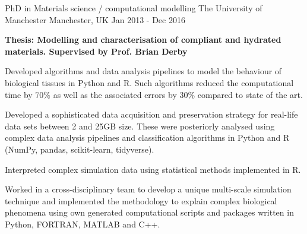 


\begin{cventries}


\cventry
{PhD in Materials science / computational modelling}%
{The University of Manchester} %
{Manchester, UK} %
{Jan 2013 - Dec 2016} %
{ %
\begin{cvitems}
\item[]{\textbf{Thesis: Modelling and characterisation of compliant and hydrated materials. Supervised by Prof. Brian Derby}}
\item{ Developed algorithms and data analysis pipelines to model the behaviour of biological tissues in Python and R. Such algorithms reduced  the computational time by 70\% as well as the associated errors by 30\% compared to state of the art.}
\item{Developed a sophisticated data acquisition and preservation strategy for real-life data sets between 2 and 25GB size. These were posteriorly analysed using complex data analysis pipelines and classification algorithms in Python and R (NumPy, pandas, scikit-learn, tidyverse).}
\item{Interpreted complex simulation data using statistical methods implemented in R.}
\item{ Worked in a cross-disciplinary team to develop a unique multi-scale simulation technique and implemented the methodology to explain complex biological phenomena using own generated computational scripts and packages written in Python, FORTRAN, MATLAB and C++.}

\end{cvitems}}
\end{cventries}
